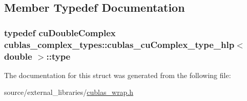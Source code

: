 \subsection{Member Typedef Documentation}
\hypertarget{structcublas__complex__types_1_1cublas__cuComplex__type__hlp_3_01double_01_4_a215753d4a8257c8998a5240596a8c2af}{
\subsubsection[{type}]{\setlength{\rightskip}{0pt plus 5cm}typedef cu\-Double\-Complex {\bf cublas\-\_\-complex\-\_\-types\-::cublas\-\_\-cu\-Complex\-\_\-type\-\_\-hlp}$<$ double $>$\-::{\bf type}}}\label{structcublas__complex__types_1_1cublas__cuComplex__type__hlp_3_01double_01_4_a215753d4a8257c8998a5240596a8c2af}


The documentation for this struct was generated from the following file\-:\begin{DoxyCompactItemize}
\item 
source/external\-\_\-libraries/\hyperlink{cublas__wrap_8h}{cublas\-\_\-wrap.\-h}\end{DoxyCompactItemize}
